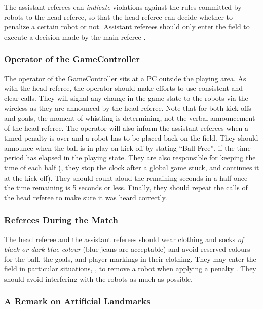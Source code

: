 The assistant referees can \textit{indicate} violations against the rules committed by robots to the head referee, so that the head referee can decide whether to penalize a certain robot or not. Assistant referees should only enter the field to execute a decision made by the main referee .

\subsubsection{Operator of the GameController}
\label{sec:gameControllerOp}
The operator of the GameController sits at a PC outside the playing area.
As with the head referee, the operator should make efforts to use consistent and clear calls.
They will signal any change in the game state to the robots via the wireless as they are announced by the head referee.
Note that for both kick-offs and goals, the moment of whistling is determining, not the verbal announcement of the head referee.
The operator will also inform the assistant referees when a timed penalty is over and a robot has to be placed back on the field.
They should announce when the ball is in play on kick-off by stating ``Ball Free'', if the \KickOffBallFreeTime time period has elapsed in the playing state.
They are also responsible for keeping the time of each half (\ie, they stop the clock after a global game stuck, and continues it at the kick-off).
They should count aloud the remaining seconds in a half once the time remaining is 5 seconds or less.
Finally, they should repeat the calls of the head referee to make sure it was heard correctly.

\subsubsection{Referees During the Match}

The head referee and the assistant referees should wear clothing and socks \emph{of black or dark blue colour} (blue jeans are acceptable) and avoid reserved colours for the ball, the goals, and player markings in their clothing. They may enter the field in particular situations, \eg, to remove a robot when applying a penalty . They should avoid interfering with the robots as much as possible.

\subsubsection{A Remark on Artificial Landmarks}
\label{sec:judgment:landmarks}

